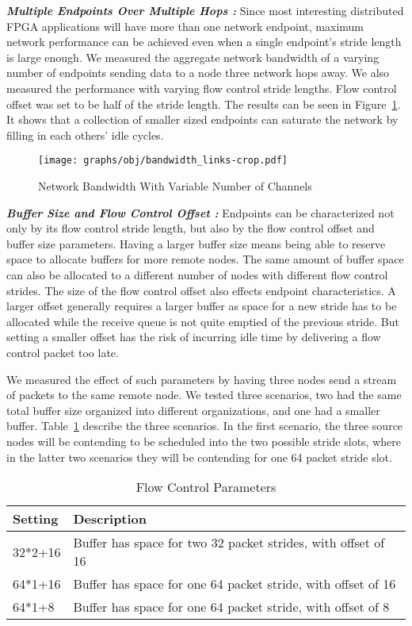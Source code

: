 \emph{\bf{Multiple Endpoints Over Multiple Hops :}}
Since most interesting distributed FPGA applications will have more than one
network endpoint, maximum network performance can be achieved even when a single
endpoint's stride length is large enough. We measured the aggregate network
bandwidth of a varying number of endpoints sending data to a node three network
hops away. We also measured the performance with varying flow control stride
lengths. Flow control offset was set to be half of the stride length. The
results can be seen in Figure~\ref{fig:bandwidth_links}. It shows that a
collection of smaller sized endpoints can saturate the network by filling in
each others' idle cycles.

\begin{figure}[b]
	\begin{center}
	\texttt{[image: graphs/obj/bandwidth\_links-crop.pdf]}
	\caption{Network Bandwidth With Variable Number of Channels}
	\label{fig:bandwidth_links}
	\end{center}
\end{figure}

\emph{\bf{Buffer Size and Flow Control Offset :}}
Endpoints can be characterized not only by its flow control stride length, but
also by the flow control offset and buffer size parameters. Having a larger
buffer size means being able to reserve space to allocate buffers for more
remote nodes. The same amount of buffer space can also be allocated to a
different number of nodes with different flow control strides. 
The size of the flow control offset also effects endpoint characteristics. A
larger offset generally requires a larger buffer as space for a new stride has
to be allocated while the receive queue is not quite emptied of the previous
stride. But setting a smaller offset has the risk of incurring
idle time by delivering a flow control packet too late.

We measured the effect of such parameters by having three nodes send a stream of
packets to the same remote node. We tested three scenarios, two had the same total
buffer size organized into different organizations, and one had a smaller
buffer. Table~\ref{tab:offsetresults} describe the three
scenarios. In the first scenario, the three source nodes will be contending to
be scheduled into the two possible stride slots, where in the latter two
scenarios they will be contending for one 64 packet stride slot.

\begin{table}[h]
	\begin{tabular}{l | l}
		Setting & Description \\
		\hline
		32*2+16 & Buffer has space for two 32 packet strides, with offset of 16\\
		64*1+16 & Buffer has space for one 64 packet stride, with offset of 16\\
		64*1+8 & Buffer has space for one 64 packet stride, with offset of 8\\
		\hline
	\end{tabular}
	\caption{Flow Control Parameters}
	\label{tab:offsetresults}
\end{table}

